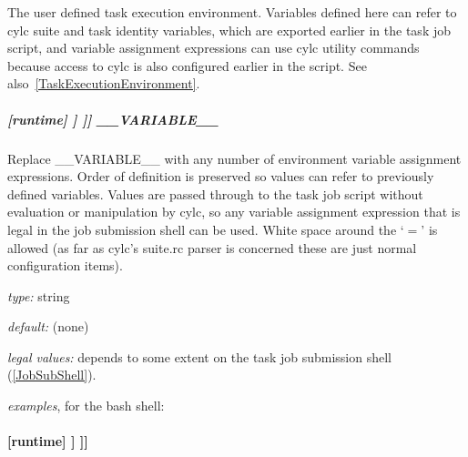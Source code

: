 The user defined task execution environment. Variables defined here can
refer to cylc suite and task identity variables, which are exported
earlier in the task job script, and variable assignment expressions can
use cylc utility commands because access to cylc is also configured
earlier in the script.  See also~\ref{TaskExecutionEnvironment}.

\subparagraph[\_\_VARIABLE\_\_ ]{[runtime] \textrightarrow [[\_\_NAME\_\_]] \textrightarrow [[[environment]]] \textrightarrow \_\_VARIABLE\_\_}
\label{AppendixTaskExecutionEnvironment}

Replace \_\_VARIABLE\_\_ with any number of environment variable
assignment expressions.
Order of definition is preserved so values can refer to previously
defined variables. Values are passed through to the task job script
without evaluation or manipulation by cylc, so any variable assignment
expression that is legal in the job submission shell can be used.
White space around the `$=$' is allowed (as far as cylc's suite.rc
parser is concerned these are just normal configuration items).

\begin{myitemize}
\item {\em type:} string
\item {\em default:} (none)
\item {\em legal values:} depends to some extent on the task job
    submission shell (\ref{JobSubShell}).
\item {\em examples}, for the bash shell:
\end{myitemize}

\paragraph[{[[[}environment filter{]]]}]{ [runtime] \textrightarrow [[\_\_NAME\_\_]] \textrightarrow [[[environment filter]]]}
\label{EnvironmentFilter}

